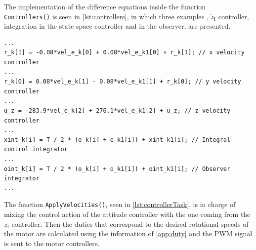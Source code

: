 The implementation of the difference equations inside the function \lstinline[style=customcppinline]{Controllers()} is seen in \autoref{lst:controllers}, in which three examples , $\dot{z}_{\mathrm{I}}$ controller, integration in the state space controller and in the observer, are presented.

\begin{lstlisting}[style=customcpp,
caption={Code for the controllers.}, 
label=lst:controllers]
...
r_k[1] = -0.08*vel_e_k[0] + 0.08*vel_e_k1[0] + r_k[1]; // x velocity controller
...
r_k[0] = 0.08*vel_e_k[1] - 0.08*vel_e_k1[1] + r_k[0]; // y velocity controller
...
u_z = -283.9*vel_e_k[2] + 276.1*vel_e_k1[2] + u_z; // z velocity controller
...
xint_k[i] = T / 2 * (e_k[i] + e_k1[i]) + xint_k1[i]; // Integral control integrator
...
oint_k[i] = T / 2 * (o_k[i] + o_k1[i]) + oint_k1[i]; // Observer integrator
...

\end{lstlisting}

The function \lstinline[style=customcppinline]{ApplyVelocities()}, seen in \autoref{lst:controllerTask}, is in charge of mixing the control action of the attitude controller with the one coming from the $z_{\mathrm{I}}$ controller. Then the duties that correspond to the desired rotational speeds of the motor are calculated using the information of \autoref{app:duty} and the PWM signal is sent to the motor controllers.











